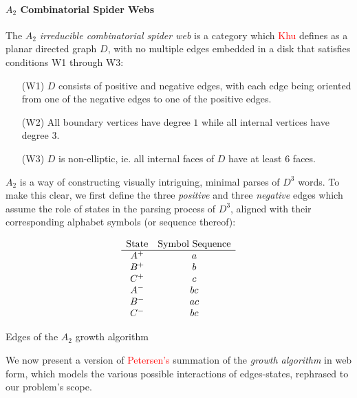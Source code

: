 \documentclass[nonatbib,numbers,10pt]{sigplanconf}
\newcommand\todo[1]{\textcolor{red}{#1}}
\begin{document}
\paragraph{$A_2$ Combinatorial Spider Webs}
The $A_2$ \textit{irreducible combinatorial spider web} is a category which \todo{Khu} defines as a planar directed graph $D$, with no multiple edges embedded in a disk that satisfies conditions W1 through W3:
\begin{enumerate}
\item[(W1)] $D$ consists of positive and negative edges, with each edge being oriented from one of the negative edges to one of the positive edges.
\item[(W2)] All boundary vertices have degree $1$ while all internal vertices have degree $3$.
\item[(W3)] $D$ is non-elliptic, ie. all internal faces of $D$ have at least $6$ faces.
\end{enumerate}

$A_2$ is a way of constructing visually intriguing, minimal parses of $D^3$ words. To make this clear, we first define the three \textit{positive} and three \textit{negative} edges which assume the role of states in the parsing process of $D^3$, aligned with their corresponding alphabet symbols (or sequence thereof):
\begin{table}[h!]
\[\begin{array}{c c}
$State$ & $Symbol Sequence$\\
\hline
A^+ & a\\
B^+ & b\\
C^+ & c\\
A^- & bc\\
B^- & ac\\
C^- & bc\\
\end{array}\]
\caption{Edges of the $A_2$ growth algorithm}
\end{table}

We now present a version of \todo{Petersen's} summation of the \textit{growth algorithm} in web form, which models the various possible interactions of edges-states, rephrased to our problem's scope.
\end{document}
